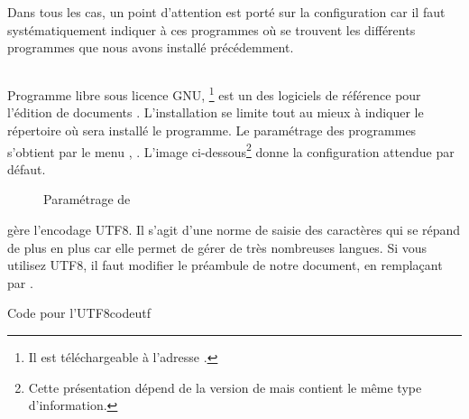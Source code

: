 Dans tous les cas, un point d'attention est porté sur la configuration car il faut systématiquement indiquer à ces programmes où se trouvent les différents programmes que nous avons installé précédemment.


\subsection{}

Programme libre sous licence GNU, \footnote{Il est téléchargeable à l'adresse .} est un des logiciels de référence pour l'édition de documents . L'installation se limite tout au mieux à indiquer le répertoire où sera installé le programme. Le paramétrage des programmes s'obtient par le menu , . L'image ci-dessous\footnote{Cette présentation dépend de la version de  mais contient le même type d'information.} donne la configuration attendue par défaut.

\begin{figure}[H]
\centering
{}
\caption{Paramétrage de }
\end{figure}

 gère l'encodage UTF8. Il s'agit d'une norme de saisie des caractères qui se répand de plus en plus car elle permet de gérer de très nombreuses langues. Si vous utilisez UTF8, il faut modifier le préambule de notre document, en remplaçant  par . 

\begin{codesimple}{Code pour l'UTF8}{codeutf}
\usepackage[utf8]{inputenc}
\end{codesimple}

